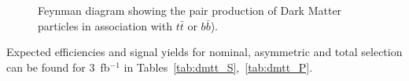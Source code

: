 \begin{figure}[h!]
  \centering
  \caption{Feynman diagram showing the pair production of Dark Matter particles in association with $t\bar{t}$ or $b\bar{b}$). \cite{Abercrombie:2015wmb}}
  \label{fig:feynman_hf}
\end{figure}


Expected efficiencies and signal yields for nominal, asymmetric and total selection can be found for 3~fb$^{-1}$ in Tables~\ref{tab:dmtt_S},~\ref{tab:dmtt_P}.

